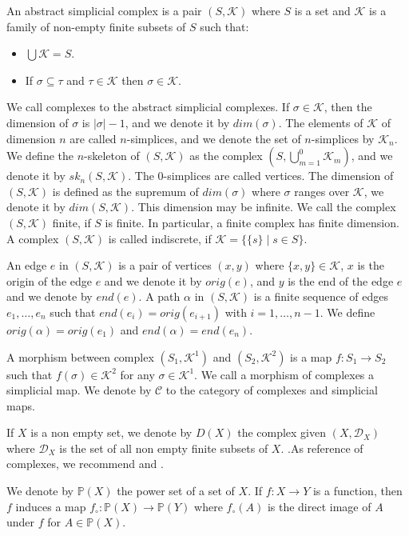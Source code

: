 \documentclass{amsart}
\begin{document}
An abstract simplicial complex is a pair $(S,\mathcal{K})$ where $S$ is a set and $\mathcal{K}$ is a family of non-empty finite subsets of $S$ such that:
\begin{itemize}
\item $\bigcup\mathcal{K}=S$.
\item If $\sigma\subseteq \tau$ and $\tau\in \mathcal{K}$ then $\sigma\in\mathcal{K}$.
\end{itemize}
We call complexes to the abstract simplicial complexes.  If $\sigma\in \mathcal{K}$, then the dimension of $\sigma$ is $\vert\sigma\vert-1$, and we denote it by $dim(\sigma)$. The elements of $\mathcal{K}$ of dimension $n$ are called $n$-simplices, and we denote the set of $n$-simplices by $\mathcal{K}_n$. We define the $n$-skeleton of $(S,\mathcal{K})$ as the complex $(S,\bigcup_{m=1}^0\mathcal{K}_m)$, and we denote it by $sk_n(S,\mathcal{K})$. The $0$-simplices are called vertices. The dimension of $(S,\mathcal{K})$ is defined as the supremum of $dim(\sigma)$ where $\sigma$ ranges over $\mathcal{K}$, we denote it by $dim(S,\mathcal{K})$. This dimension may be infinite. We call the complex $(S,\mathcal{K})$  finite, if $S$ is finite. In particular, a finite complex has finite dimension. A complex $(S,\mathcal{K})$ is called indiscrete, if $\mathcal{K}=\{\{s\}\mid s\in S\}$.

An edge $e$ in $(S,\mathcal{K})$ is a pair of vertices  $(x,y)$ where $\{x,y\}\in\mathcal{K}$, $x$ is the origin of the edge $e$ and we denote it by $orig(e)$, and $y$ is the end of the edge $e$ and we denote by $end(e)$. A path $\alpha$ in $(S,\mathcal{K})$ is a finite sequence of edges $e_1,\dots,e_n$ such that $end(e_i)=orig(e_{i+1})$ with $i=1,\dots,n-1$. We define $orig(\alpha)=orig(e_1)$ and $end(\alpha)=end(e_n)$. 

A morphism between complex $(S_1,\mathcal{K}^1)$ and $(S_2,\mathcal{K}^2)$ is a map $f\colon S_1\longrightarrow S_2$ such that $f(\sigma)\in \mathcal{K}^2$ for any $\sigma\in\mathcal{K}^1$. We call a morphism of complexes a simplicial map. We  denote by $\mathcal{C}$ to the category of complexes and simplicial maps.

If $X$ is a non empty set, we denote by $D(X)$ the complex given $(X,\mathcal{D}_X)$ where $\mathcal{D}_X$ is the set of all non empty finite subsets of $X$. .As reference of complexes, we recommend \cite{singer2015lecture}  and \cite{spanier1989algebraic}.


We denote by $\mathbb{P}(X)$ the power set of a set of $X$. If $f\colon X\longrightarrow Y$ is a function, then $f$ induces a map $f_\circ \colon\mathbb{P}(X)\longrightarrow \mathbb{P}(Y)$ where $f_\circ(A)$ is the direct image of $A$ under $f$ for $A\in\mathbb{P}(X)$. 
\end{document}
